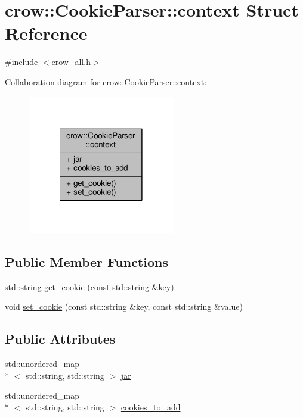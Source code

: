 \hypertarget{structcrow_1_1_cookie_parser_1_1context}{\section{crow\-:\-:Cookie\-Parser\-:\-:context Struct Reference}
\label{structcrow_1_1_cookie_parser_1_1context}
}


{\ttfamily \#include $<$crow\-\_\-all.\-h$>$}



Collaboration diagram for crow\-:\-:Cookie\-Parser\-:\-:context\-:
\nopagebreak
\begin{figure}[H]
\begin{center}
\leavevmode
\includegraphics[width=182pt]{structcrow_1_1_cookie_parser_1_1context__coll__graph}
\end{center}
\end{figure}
\subsection*{Public Member Functions}
\begin{DoxyCompactItemize}
\item 
std\-::string \hyperlink{structcrow_1_1_cookie_parser_1_1context_afe63f1def72bf3ea1ec97dc078bc0845}{get\-\_\-cookie} (const std\-::string \&key)
\item 
void \hyperlink{structcrow_1_1_cookie_parser_1_1context_aa4f0fd1e550376b442f3fc8cf8659a34}{set\-\_\-cookie} (const std\-::string \&key, const std\-::string \&value)
\end{DoxyCompactItemize}
\subsection*{Public Attributes}
\begin{DoxyCompactItemize}
\item 
std\-::unordered\-\_\-map\\*
$<$ std\-::string, std\-::string $>$ \hyperlink{structcrow_1_1_cookie_parser_1_1context_a65674550c5ee9ade652a4785c6b9b30c}{jar}
\item 
std\-::unordered\-\_\-map\\*
$<$ std\-::string, std\-::string $>$ \hyperlink{structcrow_1_1_cookie_parser_1_1context_a4ceb4f28367b1a38ed1decc355d701eb}{cookies\-\_\-to\-\_\-add}
\end{DoxyCompactItemize}


